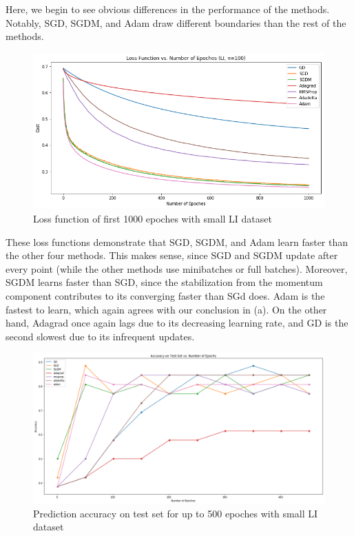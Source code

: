 \documentclass[twoside,11pt]{homework}
\begin{document}
Here, we begin to see obvious differences in the performance of the methods. Notably, SGD, SGDM, and Adam draw different boundaries than the rest of the methods.

	\begin{figure}[H]
		\centering
		\includegraphics[scale=.5]{q5/insep_100/loss.png}
		\caption{Loss function of first 1000 epoches with small LI dataset}
	\end{figure}

	These loss functions demonstrate that SGD, SGDM, and Adam learn faster than the other four methods. This makes sense, since SGD and SGDM update after every point (while the other methods use minibatches or full batches). Moreover, SGDM learns faster than SGD, since the stabilization from the momentum component contributes to its converging faster than SGd does. Adam is the fastest to learn, which again agrees with our conclusion in (a). On the other hand, Adagrad once again lags due to its decreasing learning rate, and GD is the second slowest due to its infrequent updates.

\begin{figure}[H]
		\centering
		\includegraphics[scale=.3]{q5/insep_100/acc.png}
		\caption{Prediction accuracy on test set for up to 500 epoches with small LI dataset}
	\end{figure}
\end{document}
